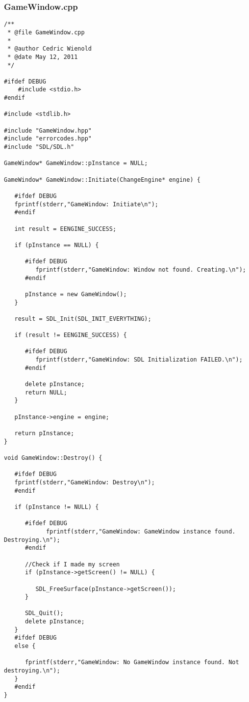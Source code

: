 \documentclass[12pt]{article}
\begin{document}
\subsubsection{GameWindow.cpp}
\begin{lstlisting}[breaklines]
/**
 * @file GameWindow.cpp
 *
 * @author Cedric Wienold
 * @date May 12, 2011
 */

#ifdef DEBUG
	#include <stdio.h>
#endif

#include <stdlib.h>

#include "GameWindow.hpp"
#include "errorcodes.hpp"
#include "SDL/SDL.h"

GameWindow* GameWindow::pInstance = NULL;

GameWindow* GameWindow::Initiate(ChangeEngine* engine) {

   #ifdef DEBUG
   fprintf(stderr,"GameWindow: Initiate\n");
   #endif

   int result = EENGINE_SUCCESS;

   if (pInstance == NULL) {

      #ifdef DEBUG
         fprintf(stderr,"GameWindow: Window not found. Creating.\n");
      #endif

      pInstance = new GameWindow();
   }

   result = SDL_Init(SDL_INIT_EVERYTHING);

   if (result != EENGINE_SUCCESS) {

      #ifdef DEBUG
         fprintf(stderr,"GameWindow: SDL Initialization FAILED.\n");
      #endif

      delete pInstance;
      return NULL;
   }

   pInstance->engine = engine;

   return pInstance;
}

void GameWindow::Destroy() {

   #ifdef DEBUG
   fprintf(stderr,"GameWindow: Destroy\n");
   #endif

   if (pInstance != NULL) {

      #ifdef DEBUG
            fprintf(stderr,"GameWindow: GameWindow instance found. Destroying.\n");
      #endif

      //Check if I made my screen
      if (pInstance->getScreen() != NULL) {

         SDL_FreeSurface(pInstance->getScreen());
      }

      SDL_Quit();
      delete pInstance;
   }
   #ifdef DEBUG
   else {

      fprintf(stderr,"GameWindow: No GameWindow instance found. Not destroying.\n");
   }
   #endif
}


\end{lstlisting}
\end{document}

